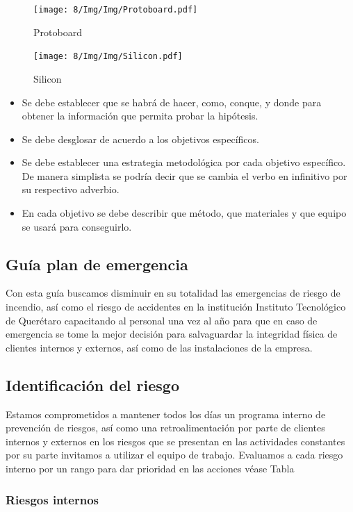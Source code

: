     \begin{figure}[H]
        \centering
        \texttt{[image: 8/Img/Img/Protoboard.pdf]}
        \caption{Protoboard}
        \label{Protoboard}
    \end{figure}
    
    \begin{figure}[H]
        \centering
        \texttt{[image: 8/Img/Img/Silicon.pdf]}
        \caption{Silicon}
        \label{Siliconl}
    \end{figure}
    \begin{itemize}
        \item Se debe establecer que se habrá de hacer, como, conque, y donde para obtener la información que permita probar la hipótesis.  
        \item Se debe desglosar de acuerdo a los objetivos específicos. 
        \item Se debe establecer una estrategia metodológica por cada objetivo específico. De manera simplista se podría decir que se cambia el verbo en infinitivo por su respectivo adverbio.
        \item En cada objetivo se debe describir que método, que materiales y que equipo se usará para conseguirlo.
    \end{itemize}
    \subsection{Guía plan de emergencia}
    Con esta guía buscamos disminuir en su totalidad las emergencias de riesgo de incendio, así como el riesgo de accidentes en la institución Instituto Tecnológico de Querétaro capacitando al personal una vez al año para que en caso de emergencia se tome la mejor decisión para salvaguardar la integridad física de clientes internos y externos, así como de las instalaciones de la empresa.
    
    \subsection{Identificación del riesgo}
    Estamos comprometidos a mantener todos los días un programa interno de prevención de riesgos, así como una retroalimentación por parte de clientes internos y externos en los riesgos que se presentan en las actividades constantes por su parte invitamos a utilizar el equipo de trabajo.
    Evaluamos a cada riesgo interno por un rango para dar prioridad en las acciones véase Tabla
    \subsubsection{Riesgos internos}
    
